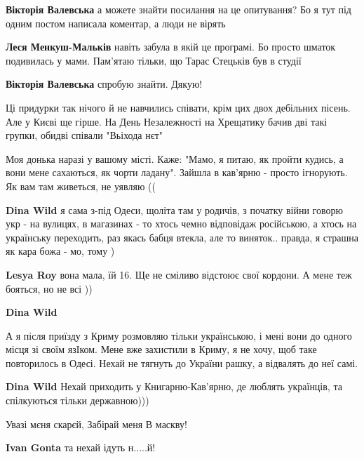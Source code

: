\begin{itemize}
\begin{itemize}
\textbf{Вікторія Валевська} а можете знайти посилання на це опитування? Бо я тут під одним постом написала коментар, а люди не вірять

\textbf{Леся Менкуш-Мальків} навіть забула в якій це програмі. Бо просто шматок подивилась у мами. Пам'ятаю тільки, що Тарас Стецьків був в студії

\textbf{Вікторія Валевська} спробую знайти. Дякую!

\end{itemize} %


Ці придурки так нічого й не навчились співати, крім цих двох дебільних пісень.
Але у Києві ще гірше. На День Незалежності на Хрещатику бачив дві такі групки,
обидві співали "Вьіхода нєт"



Моя донька наразі у вашому місті. Каже: "Мамо, я питаю, як пройти кудись, а
вони мене сахаються, як чорти ладану". Зайшла в кав'ярню - просто ігнорують. Як
вам там живеться, не уявляю ((

\begin{itemize} %
\textbf{Dina Wild} я сама з-під Одеси, щоліта там у родичів, з початку війни говорю укр - на вулицях, в магазинах - то хтось чемно відповідаж російською, а хтось на українську переходить, раз якась бабця втекла, але то виняток..
правда, я страшна як кара божа - мо, тому )

\textbf{Lesya Roy} вона мала, їй 16. Ще не сміливо відстоює свої кордони. А мене теж бояться, но не всі ))

\textbf{Dina Wild} 

А я після приїзду з Криму розмовляю тільки українською, і мені вони до одного
місця зі своїм язІком. Мене вже захистили в Криму, я не хочу, щоб таке повторилось
в Одесі. Нехай не тягнуть до України рашку, а відвалять до неї самі.

\textbf{Dina Wild} Нехай приходить у Книгарню-Кав'ярню, де люблять українців, та спілкуються тільки державною)))
\end{itemize} %

Увазі мєня скарєй,
Забірай меня
В маскву!

\begin{itemize} %
\textbf{Ivan Gonta} та нехай ідуть н.....й!


\end{itemize}
\end{itemize}
